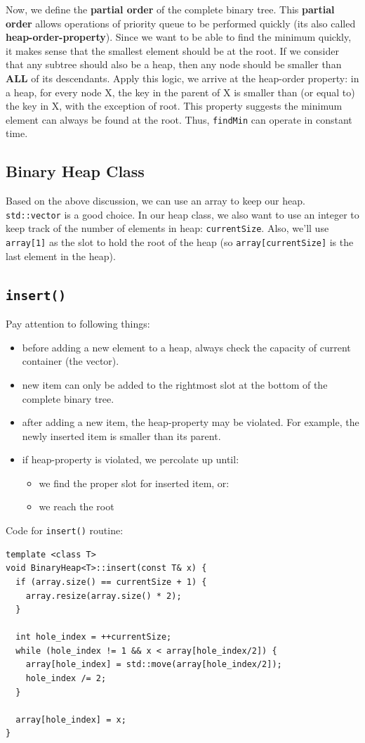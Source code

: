 \documentclass[12pt]{book}
\begin{document}
Now, we define the \textbf{partial order} of the complete binary tree. This \textbf{partial order} allows operations of priority queue to be performed quickly (its also called \textbf{heap-order-property}). Since we want to be able to find the minimum quickly, it makes sense that the smallest element should be at the root. If we consider that any subtree should also be a heap, then any node should be smaller than \textbf{ALL} of its descendants. Apply this logic, we arrive at the heap-order property: in a heap, for every node X, the key in the parent of X is smaller than (or equal to) the key in X, with the exception of root. This property suggests the minimum element can always be found at the root. Thus, \texttt{findMin} can operate in constant time.
\subsection{Binary Heap Class}
\label{sec:org087a421}

Based on the above discussion, we can use an array to keep our heap. \texttt{std::vector} is a good choice. In our heap class, we also want to use an integer to keep track of the number of elements in heap: \texttt{currentSize}. Also, we'll use \texttt{array[1]} as the slot to hold the root of the heap (so \texttt{array[currentSize]} is the last element in the heap).
\subsection{\texttt{insert()}}
\label{sec:org5b180b9}

Pay attention to following things:
\begin{itemize}
\item before adding a new element to a heap, always check the capacity of current container (the vector).
\item new item can only be added to the rightmost slot at the bottom of the complete binary tree.
\item after adding a new item, the heap-property may be violated. For example, the newly inserted item is smaller than its parent.
\item if heap-property is violated, we percolate up until:
\begin{itemize}
\item we find the proper slot for inserted item, or:
\item we reach the root
\end{itemize}
\end{itemize}
Code for \texttt{insert()} routine:
\begin{verbatim}
template <class T>
void BinaryHeap<T>::insert(const T& x) {
  if (array.size() == currentSize + 1) {
    array.resize(array.size() * 2);
  }

  int hole_index = ++currentSize;
  while (hole_index != 1 && x < array[hole_index/2]) {
    array[hole_index] = std::move(array[hole_index/2]);
    hole_index /= 2;
  }

  array[hole_index] = x;
}
\end{verbatim}
\end{document}
